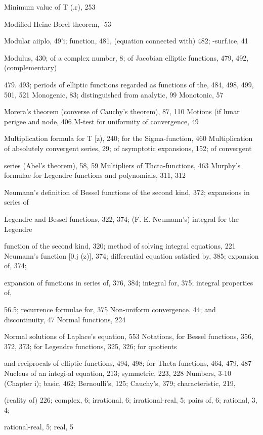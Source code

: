 Minimum value of T (.r), 253

%
%

Modified Heine-Borel theorem, -53

Modular aiiplo, 49'i; function, 481, (equation connected with) 482; -surf.ice, 41

Modulus, 430; of a complex number, 8; of Jacobian elliptic functions, 479, 492, (complementary)

479. 493; periods of elliptic functions regarded as functions of the, 484, 498, 499, 501, 521
Monogenic, 83; distinguished from analytic, 99
Monotonic, 57

Morera's theorem (converse of Cauchy's theorem), 87, 110
Motions (if lunar perigee and node, 406
M-test for uniformity of convergence, 49

Multiplication formula for T [z), 240; for the Sigma-function, 460
Multiplication of absolutely convergent series, 29; of asymptotic expansions, 152; of convergent

series (Abel's theorem), 58, 59
Multipliers of Thcta-functions, 463
Murphy's formulae for Legendre functions and polynomials, 311, 312

Neumann's definition of Bessel functions of the second kind, 372; expansions in series of

Legendre and Bessel functions, 322, 374; (F. E. Neumann's) integral for the Legendre

function of the second kind, 320; method of solving integral equations, 221
Neumann's function [0,j (z)], 374; differential equation satisfied by, 385; expansion of, 374;

expansion of functions in series of, 376, 384; integral for, 375; integral properties of,

56.5; recurrence formulae for, 375
Non-uniform convergence. 44; and discontinuity, 47
Normal functions, 224

Normal solutions of Laplace's equation, 553
Notations, for Bessel functions, 356, 372, 373; for Legendre functions, 325, 326; for quotients

and reciprocals of elliptic functions, 494, 498; for Theta-functions, 464, 479, 487
Nucleus of an integi-al equation, 213; symmetric, 223, 228
Numbers, 3-10 (Chapter i); basic, 462; Bernoulli's, 125; Cauchy's, 379; characteristic, 219,

(reality of) 226; complex, 6; irrational, 6; irrational-real, 5; pairs of, 6; rational, 3, 4;

rational-real, 5; real, 5

